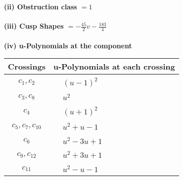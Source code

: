 \documentclass[1p]{elsarticle_modified}
\theoremstyle{definition}
\begin{document}
\flushleft \textbf{(ii) Obstruction class $= 1$}\\~\\
\flushleft \textbf{(iii) Cusp Shapes $= -\frac{45}{2} v-\frac{183}{4}$}\\~\\
\newpage\renewcommand{\arraystretch}{1}
\flushleft \textbf{(iv) u-Polynomials at the component}\newline \\
\begin{tabular}{m{50pt}|m{274pt}}
Crossings & \hspace{64pt}u-Polynomials at each crossing \\
\hline $$\begin{aligned}c_{1},c_{2}\end{aligned}$$&$\begin{aligned}
&(u-1)^2
\end{aligned}$\\
\hline $$\begin{aligned}c_{3},c_{8}\end{aligned}$$&$\begin{aligned}
&u^2
\end{aligned}$\\
\hline $$\begin{aligned}c_{4}\end{aligned}$$&$\begin{aligned}
&(u+1)^2
\end{aligned}$\\
\hline $$\begin{aligned}c_{5},c_{7},c_{10}\end{aligned}$$&$\begin{aligned}
&u^2+u-1
\end{aligned}$\\
\hline $$\begin{aligned}c_{6}\end{aligned}$$&$\begin{aligned}
&u^2-3 u+1
\end{aligned}$\\
\hline $$\begin{aligned}c_{9},c_{12}\end{aligned}$$&$\begin{aligned}
&u^2+3 u+1
\end{aligned}$\\
\hline $$\begin{aligned}c_{11}\end{aligned}$$&$\begin{aligned}
&u^2- u-1
\end{aligned}$\\
\hline
\end{tabular}\\~\\
\end{document}
